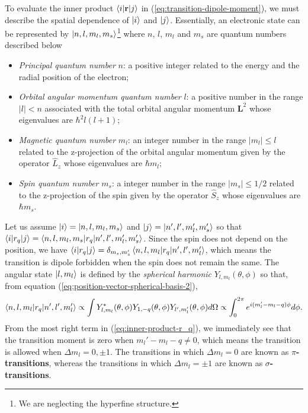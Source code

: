 {To evaluate the inner product $ \braket{i|\mathbf{r}|j} $ in (\ref{eq:transition-dipole-moment}), we must describe the spatial dependence of $ \ket{i} $ and $ \ket{j} $. Essentially, an electronic state can be represented by $ \ket{n, l, m_l, m_s} $\footnote{We are neglecting the hyperfine structure.} where $n$, $l$, $m_l$ and $ m_s $ are quantum numbers described below
\begin{itemize}
	\item \textit{Principal quantum number} $ n $: a positive integer related to the energy and the radial position of the electron; 

	\item \textit{Orbital angular momentum quantum number} $ l $: a positive number in the range $ |l| < n  $ associated with the total orbital angular momentum $ \mathbf{L}^2 $ whose eigenvalues are $ \hbar^2 l(l + 1) $;

	\item \textit{Magnetic quantum number} $ m_l $: an integer number in the range $ |m_l| \leq l $ related to the z-projection of the orbital angular momentum given by the operator $ \hat{L}_z $ whose eigenvalues are $ \hbar m_l $;

	\item \textit{Spin quantum number} $ m_s $: a integer number in the range $ |m_s| \leq 1/2 $ related to the z-projection of the spin given by the operator $ \hat{S}_z $ whose eigenvalues are $ \hbar m_s $.
\end{itemize}

Let us assume $ \ket{i} = \ket{n,l,m_l,m_s} $ and $ \ket{j} = \ket{n',l',m_l',m_s'} $ so that $ \braket{i|r_q|j} = \braket{n,l,m_l,m_s|r_q|n',l',m_l',m_s'} $. Since the spin does not depend on the position, we have $ \braket{i|r_q|j} = \delta_{m_s,m_s'}\braket{n,l,m_l|r_q|n',l',m_l'} $, which means the transition is dipole forbidden when the spin does not remain the same. The angular state $ \ket{l, m_l} $ is defined by the \textit{spherical harmonic} $ Y_{l,m_l}(\theta, \phi) $ so that, from equation (\ref{eq:position-vector-spherical-basis-2}),
\begin{equation}
	\braket{n,l,m_l|r_q|n',l',m_l'} \propto \int Y_{l,m_l}^*(\theta, \phi) Y_{1, -q}(\theta, \phi) Y_{l', m_l'}(\theta, \phi)d\Omega \propto \int_{0}^{2\pi} e^{i(m_l' - m_l - q)\phi} d\phi.
	\label{eq:inner-product-r_q}
\end{equation}
From the most right term in (\ref{eq:inner-product-r_q}), we immediately see that the transition moment is zero when $ m_l' - m_l - q \neq 0 $, which means the transition is allowed when $ \Delta m_l = 0, \pm 1 $. The transitions in which $ \Delta m_l = 0 $ are known as \textbf{$\pi$-transitions}, whereas the transitions in which $ \Delta m_l = \pm 1$ are known as \textbf{$\sigma$-transitions}.

}
